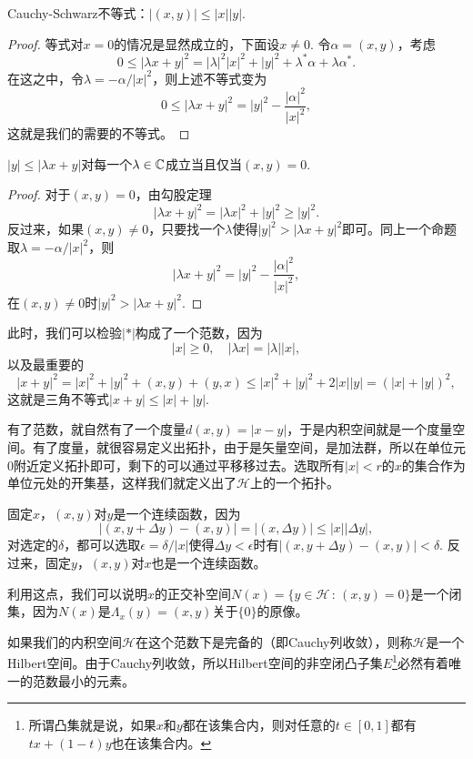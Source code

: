 \begin{pro}
Cauchy-Schwarz不等式：$|(x,y)|\leq |x||y|$.
\end{pro}

\begin{proof}
等式对$x=0$的情况是显然成立的，下面设$x\neq 0$. 令$\alpha=(x,y)$，考虑
	\[
		0\leq |\lambda x+y|^2=|\lambda|^2|x|^2+|y|^2+\lambda^* \alpha+\lambda \alpha^*.
	\]
	在这之中，令$\lambda=-\alpha/|x|^2$，则上述不等式变为
	\[
		0\leq |\lambda x+y|^2=|y|^2-\frac{|\alpha|^2}{|x|^2},
	\]
	这就是我们的需要的不等式。
\end{proof}

\begin{pro}
$|y|\leq |\lambda x+y|$对每一个$\lambda \in \mathbb{C}$成立当且仅当$(x,y)=0$.
\end{pro}

\begin{proof}
对于$(x,y)=0$，由勾股定理
\[
	|\lambda x+y|^2=|\lambda x|^2+ |y|^2\geq |y|^2.
\]
反过来，如果$(x,y)\neq 0$，只要找一个$\lambda$使得$|y|^2>|\lambda x+y|^2$即可。同上一个命题取$\lambda=-\alpha/|x|^2$，则
\[
	|\lambda x+y|^2=|y|^2-\frac{|\alpha|^2}{|x|^2},
\]
在$(x,y)\neq 0$时$|y|^2>|\lambda x+y|^2$. 
\end{proof}

此时，我们可以检验$|*|$构成了一个范数，因为
\[
	|x|\geq 0,\quad |\lambda x|=|\lambda||x|,
\]
以及最重要的
\[
	|x+y|^2=|x|^2+|y|^2+(x,y)+(y,x)\leq |x|^2+|y|^2+2|x||y|=(|x|+|y|)^2,
\]
这就是三角不等式$|x+y|\leq |x|+|y|$.

\begin{para}
有了范数，就自然有了一个度量$d(x,y)=|x-y|$，于是内积空间就是一个度量空间。有了度量，就很容易定义出拓扑，由于是矢量空间，是加法群，所以在单位元$0$附近定义拓扑即可，剩下的可以通过平移移过去。选取所有$|x|<r$的$x$的集合作为单位元处的开集基，这样我们就定义出了$\mathcal{H}$上的一个拓扑。

固定$x$，$(x,y)$对$y$是一个连续函数，因为
\[
	|(x,y+\Delta y)-(x,y)|=|(x,\Delta y)|\leq |x||\Delta y|,
\]
对选定的$\delta$，都可以选取$\epsilon=\delta/|x|$使得$\Delta y<\epsilon$时有$|(x,y+\Delta y)-(x,y)|<\delta$. 反过来，固定$y$，$(x,y)$对$x$也是一个连续函数。

利用这点，我们可以说明$x$的正交补空间$N(x)=\{y\in\mathcal{H}\,:\, (x,y)=0\}$是一个闭集，因为$N(x)$是$\Lambda_x(y)=(x,y)$关于$\{0\}$的原像。
\end{para}

\begin{para}
如果我们的内积空间$\mathcal{H}$在这个范数下是完备的（即Cauchy列收敛），则称$\mathcal{H}$是一个Hilbert空间。由于Cauchy列收敛，所以Hilbert空间的非空闭凸子集$E$\footnote{所谓凸集就是说，如果$x$和$y$都在该集合内，则对任意的$t\in [0,1]$都有$tx+(1-t)y$也在该集合内。}必然有着唯一的范数最小的元素。
\end{para}

